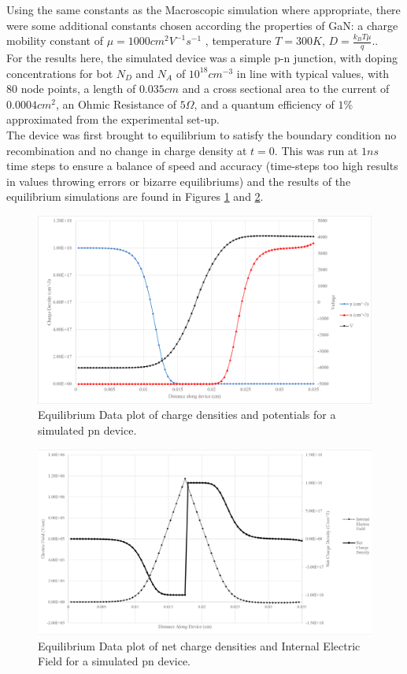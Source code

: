 \documentclass[titlepage]{article}
\begin{document}
Using the same constants as the Macroscopic simulation where appropriate, there were some additional constants chosen according the properties of GaN: a charge mobility constant of $\mu = 1000 cm^2V^{-1}s^{-1}$ \cite{NSD}, temperature $T = 300 K$, $D = \frac{k_B T \mu}{q}$..\\
For the results here, the simulated device was a simple p-n junction, with doping concentrations for bot $N_D$ and $N_A$ of $10^{18} cm^{-3}$ in line with typical values\cite{NSD}, with 80 node points, a length of $0.035cm$ and a cross sectional area to the current of $0.0004 cm^{2}$, an Ohmic Resistance of $5\Omega$, and a quantum efficiency of $1\%$ approximated from the experimental set-up. \\
The device was first brought to equilibrium to satisfy the boundary condition no recombination and no change in charge density at $t=0$. This was run at $1 ns$ time steps to ensure a balance of speed and accuracy (time-steps too high results in values throwing errors or bizarre equilibriums) and the results of the equilibrium simulations are found in Figures \ref{res:Mic:G1} and \ref{res:Mic:G2}.\\
\begin{figure}[H]
	\centering
	\includegraphics[scale=0.7]{Figures/035mm80n18_eqm_Graph1}
	\caption{Equilibrium Data plot of charge densities and potentials for a simulated pn device.\label{res:Mic:G1}}
\end{figure}
\begin{figure}[H]
	\centering
	\includegraphics[scale=0.7]{Figures/035mm80n18_eqm_Graph2.png}
	\caption{Equilibrium Data plot of net charge densities and Internal Electric Field for a simulated pn device.\label{res:Mic:G2}}
\end{figure}
\end{document}
